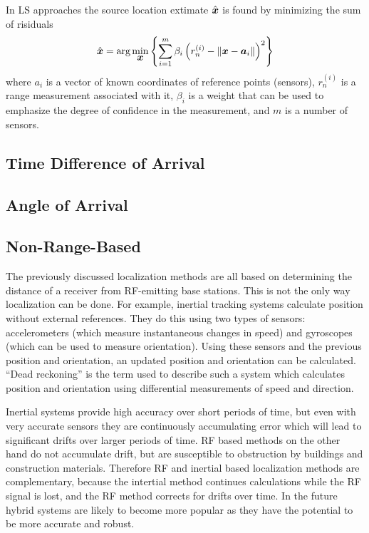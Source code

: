 In LS approaches the source location extimate $\hat{\mbox{\boldmath$x$}}$ is found by minimizing the sum of risiduals \cite{GeoLoc}
\begin{equation}
\nonumber
\hat{\mbox{\boldmath$x$}} = \mbox{arg}\min_{\mbox{\boldmath$x$}} \left\lbrace \sum_{i=1}^m \beta_i\left(r_n^{(i)} - \|\mbox{\boldmath$x$} - \mbox{\boldmath$a$}_i\|\right)^2 \right\rbrace
\end{equation}
where $a_i$ is a vector of known coordinates of reference points (sensors),   $r_n^{(i)}$ is a range measurement associated with it, $\beta_i$ is a weight
that can be used to emphasize  the degree of confidence in the measurement, and $m$ is a number of sensors.


\subsection{Time Difference of Arrival }

\subsection{Angle of Arrival }

\subsection{Non-Range-Based}

The previously discussed localization methods are all based on determining the distance of a receiver from RF-emitting base stations. This is not the only way localization can be done. For example, inertial tracking systems calculate position without external references. They do this using two types of sensors: accelerometers (which measure instantaneous changes in speed) and gyroscopes (which can be used to measure orientation). Using these sensors and the previous position and orientation, an updated position and orientation can be calculated. ``Dead reckoning'' is the term used to describe such a system which calculates position and orientation using differential measurements of speed and direction.

Inertial systems provide high accuracy over short periods of time, but even with very accurate sensors they are continuously accumulating error which will lead to significant drifts over larger periods of time. RF based methods on the other hand do not accumulate drift, but are susceptible to obstruction by buildings and construction materials. Therefore RF and inertial based localization methods are complementary, because the intertial method continues calculations while the RF signal is lost, and the RF method corrects for drifts over time. In the future hybrid systems are likely to become more popular as they have the potential to be more accurate and robust.


